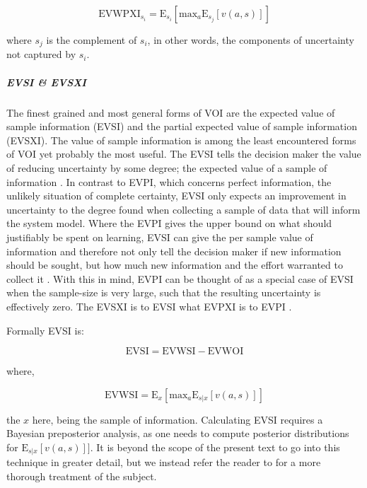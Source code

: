 \documentclass[]{article}
\theoremstyle{definition}
\theoremstyle{definition}
\theoremstyle{definition}
\theoremstyle{remark}
\begin{document}
\begin{equation}
\mathrm{EVWPXI}_{s_i} = \mathrm{E}_{s_i}[\mathrm{max}_a\mathrm{E}_{s_j}[v(a, s)]]
\label{eq:EVWPXI}
\end{equation}

where \(s_j\) is the complement of \(s_i\), in other words, the
components of uncertainty not captured by \(s_i\).

\subparagraph*{EVSI \& EVSXI}\label{evsi-evsxi}

The finest grained and most general forms of VOI are the expected value
of sample information (EVSI) \citep[e.g,][]{Runge2011a, Canessa2015} and
the partial expected value of sample information (EVSXI). The value of
sample information is among the least encountered forms of VOI yet
probably the most useful. The EVSI tells the decision maker the value of
reducing uncertainty by some degree; the expected value of a sample of
information \citep{Raiffa1961}. In contrast to EVPI, which concerns
perfect information, the unlikely situation of complete certainty, EVSI
only expects an improvement in uncertainty to the degree found when
collecting a sample of data that will inform the system model. Where the
EVPI gives the upper bound on what should justifiably be spent on
learning, EVSI can give the per sample value of information and
therefore not only tell the decision maker if new information should be
sought, but how much new information and the effort warranted to collect
it \citep{Runge2011a}. With this in mind, EVPI can be thought of as a
special case of EVSI when the sample-size is very large, such that the
resulting uncertainty is effectively zero. The EVSXI is to EVSI what
EVPXI is to EVPI \citep{Yokota2004a}.

Formally EVSI is:

\begin{equation}
\mathrm{EVSI} = \mathrm{EVWSI} - \mathrm{EVWOI}
\label{eq:EVSI}
\end{equation}

where,

\begin{equation}
\mathrm{EVWSI} =  \mathrm{E}_{x}[\mathrm{max}_a\mathrm{E}_{s|x}[v(a, s)]]
\label{eq:EVWSI}
\end{equation}

the \(x\) here, being the sample of information. Calculating EVSI
requires a Bayesian preposterior analysis, as one needs to compute
posterior distributions for \(\mathrm{E}_{s|x}[v(a, s)]]\). It is beyond
the scope of the present text to go into this technique in greater
detail, but we instead refer the reader to \citet{Berger1985} for a more
thorough treatment of the subject.
\end{document}
